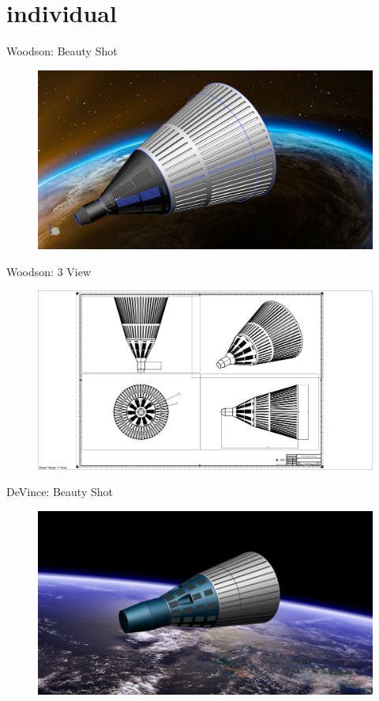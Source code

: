 \documentclass[10pt]{beamer}
\begin{document}
\section{individual}


	\begin{frame}{Woodson: Beauty Shot}
\begin{figure}
	\centering
	\includegraphics[width=\textwidth]{Woodson_Beauty.png}
\end{figure}
\end{frame}

	\begin{frame}{Woodson: 3 View}
\begin{figure}
	\centering
	\includegraphics[width=\textwidth]{Woodson_3_View.png}
\end{figure}
\end{frame}

	\begin{frame}{DeVince: Beauty Shot}
\begin{figure}
	\centering
	\includegraphics[width=\textwidth]{DeVince_Beauty.png}
\end{figure}
\end{frame}
\end{document}
